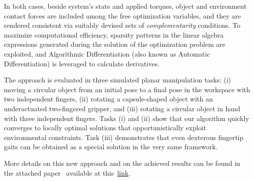 In both cases, beside system's state and applied torques, object and environment contact forces are included among the free optimization variables, and they are rendered consistent via suitably devised sets of \emph{complementarity} conditions. To maximize computational efficiency, sparsity patterns in the linear algebra expressions generated during the solution of the optimization problem are exploited, and Algorithmic Differentiation (also known as Automatic Differentiation) is leveraged to calculate derivatives. 

The approach is evaluated in three simulated planar manipulation tasks: (i) moving a circular object from an initial pose to a final pose in the workspace with two independent fingers, (ii) rotating a capsule-shaped object with an underactuated two-fingered gripper, and (iii) rotating a circular object in hand with three independent fingers. Tasks (i) and (ii) show that our algorithm quickly converges to locally optimal solutions that opportunistically exploit environmental constraints. Task (iii) demonstrates that even dexterous fingertip gaits can be obtained as a special solution in the very same framework.

More details on this new approach and on the achieved results can be found in the attached paper~\cite{Gabiccini:RSS:2015} available at this~\href{./attachedPapers/ComputationalFrameworkEnvAwareRobManipPlanning.pdf}{link}. 